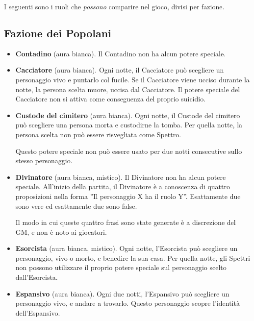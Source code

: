 \documentclass[a4paper,10pt]{article}
\begin{document}
I seguenti sono i ruoli che \emph{possono} comparire nel gioco, divisi per fazione.


\subsection*{Fazione dei Popolani}

\begin{itemize}
 \item {\bf Contadino} (aura bianca). Il Contadino non ha alcun potere speciale.

 \item {\bf Cacciatore} (aura bianca). Ogni notte, il Cacciatore può scegliere un personaggio vivo e puntarlo col fucile. Se il Cacciatore viene ucciso durante la notte, la persona scelta muore, uccisa dal Cacciatore.
 Il potere speciale del Cacciatore non si attiva come conseguenza del proprio suicidio.
 
 \item {\bf Custode del cimitero} (aura bianca). Ogni notte, il Custode del cimitero può scegliere una persona morta e custodirne la tomba. Per quella notte, la persona scelta non può essere risvegliata come Spettro.
 
 Questo potere speciale non può essere usato per due notti consecutive sullo stesso personaggio.

 \item {\bf Divinatore} (aura bianca, mistico). Il Divinatore non ha alcun potere speciale. All'inizio della partita, il Divinatore è a conoscenza di quattro proposizioni nella forma ''Il personaggio X ha il ruolo Y''. Esattamente due sono vere ed esattamente due sono false.
 
 Il modo in cui queste quattro frasi sono state generate è a discrezione del GM, e non è noto ai giocatori.

 \item {\bf Esorcista} (aura bianca, mistico). Ogni notte, l'Esorcista può scegliere un personaggio, vivo o morto, e benedire la sua casa.
 Per quella notte, gli Spettri non possono utilizzare il proprio potere speciale sul personaggio scelto dall'Esorcista.
 
 \item {\bf Espansivo} (aura bianca). Ogni due notti, l'Espansivo può scegliere un personaggio vivo, e andare a trovarlo. Questo personaggio scopre l'identità dell'Espansivo.


\end{itemize}
\end{document}

